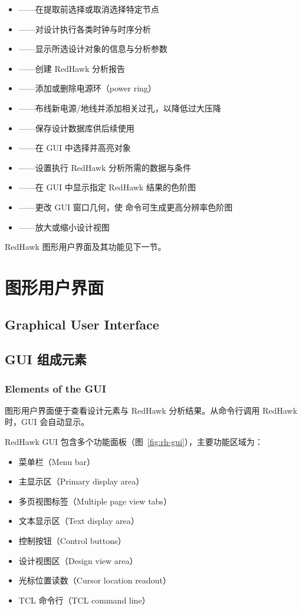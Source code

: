 \begin{itemize}
  \item {}——在提取前选择或取消选择特定节点
  \item {}——对设计执行各类时钟与时序分析
  \item {}——显示所选设计对象的信息与分析参数
  \item {}——创建 RedHawk 分析报告
  \item {}——添加或删除电源环（power ring）
  \item {}——布线新电源/地线并添加相关过孔，以降低过大压降
  \item {}——保存设计数据库供后续使用
  \item {}——在 GUI 中选择并高亮对象
  \item {}——设置执行 RedHawk 分析所需的数据与条件
  \item {}——在 GUI 中显示指定 RedHawk 结果的色阶图
  \item {}——更改 GUI 窗口几何，使  命令可生成更高分辨率色阶图
  \item {}——放大或缩小设计视图
\end{itemize}

RedHawk 图形用户界面及其功能见下一节。

\section{图形用户界面}
\subsection*{Graphical User Interface}

\subsection{GUI 组成元素}
\subsubsection*{Elements of the GUI}

图形用户界面便于查看设计元素与 RedHawk 分析结果。从命令行调用 RedHawk 时，GUI 会自动显示。

RedHawk GUI 包含多个功能面板（图~\ref{fig:rh-gui}），主要功能区域为：
\begin{itemize}
  \item 菜单栏（Menu bar）
  \item 主显示区（Primary display area）
  \item 多页视图标签（Multiple page view tabs）
  \item 文本显示区（Text display area）
  \item 控制按钮（Control buttons）
  \item 设计视图区（Design view area）
  \item 光标位置读数（Cursor location readout）
  \item TCL 命令行（TCL command line）
\end{itemize}

